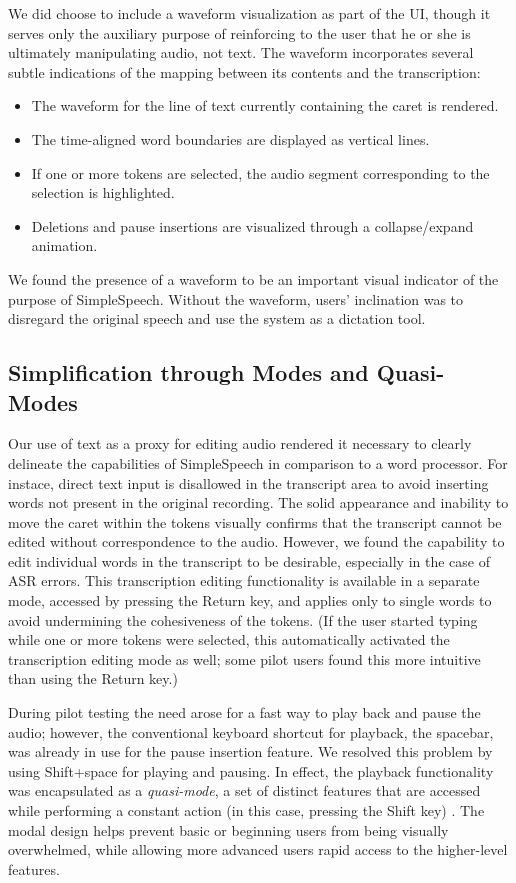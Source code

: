 We did choose to include a waveform visualization as part of the UI, though it serves only the auxiliary purpose of reinforcing to the user that he or she is ultimately manipulating audio, not text. The waveform incorporates several subtle indications of the mapping between its contents and the transcription:
\begin{itemize}
	\item The waveform for the line of text currently containing the caret is rendered.
	\item The time-aligned word boundaries are displayed as vertical lines.
	\item If one or more tokens are selected, the audio segment corresponding to the selection is highlighted.
	\item Deletions and pause insertions are visualized through a collapse/expand animation.
\end{itemize}
We found the presence of a waveform to be an important visual indicator of the purpose of SimpleSpeech.
Without the waveform, users' inclination was to disregard the original speech and use the system as a dictation tool.

\subsection{Simplification through Modes and Quasi-Modes}
Our use of text as a proxy for editing audio rendered it necessary to clearly delineate the capabilities of SimpleSpeech in comparison to a word processor.
For instace, direct text input is disallowed in the transcript area to avoid inserting words not present in the original recording.
The solid appearance and inability to move the caret within the tokens visually confirms that the transcript cannot be edited without correspondence to the audio.
However, we found the capability to edit individual words in the transcript to be desirable, especially in the case of ASR errors.
This transcription editing functionality is available in a separate mode, accessed by pressing the Return key, and applies only to single words to avoid undermining the cohesiveness of the tokens. 
(If the user started typing while one or more tokens were selected, this automatically activated the transcription editing mode as well; some pilot users found this more intuitive than using the Return key.)

During pilot testing the need arose for a fast way to play back and pause the audio; however, the conventional keyboard shortcut for playback, the spacebar, was already in use for the pause insertion feature.
We resolved this problem by using Shift+space for playing and pausing.
In effect, the playback functionality was encapsulated as a \emph{quasi-mode}, a set of distinct features that are accessed while performing a constant action (in this case, pressing the Shift key) \cite{raskin}. 
The modal design helps prevent basic or beginning users from being visually overwhelmed, while allowing more advanced users rapid access to the higher-level features.

